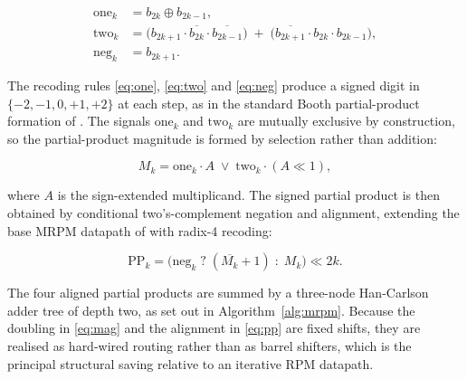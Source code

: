 \documentclass[conference]{IEEEtran}
\begin{document}
\begin{align}
\mathrm{one}_k &= b_{2k} \oplus b_{2k-1}, \label{eq:one}\\
\mathrm{two}_k &= \big(b_{2k+1}\cdot \overline{b_{2k}} \cdot
                  \overline{b_{2k-1}}\big) \;+\;
                 \big(\overline{b_{2k+1}}\cdot b_{2k} \cdot
                  b_{2k-1}\big), \label{eq:two}\\
\mathrm{neg}_k &= b_{2k+1}. \label{eq:neg}
\end{align}

\noindent The recoding rules \eqref{eq:one}, \eqref{eq:two}
and \eqref{eq:neg} produce a signed digit in $\{-2,-1,0,+1,+2\}$ at each
step, as in the standard Booth partial-product formation of \cite{prabhu}.
The signals
$\mathrm{one}_k$ and $\mathrm{two}_k$ are mutually exclusive by
construction, so the partial-product magnitude is formed by selection
rather than addition:

\begin{equation}
M_k = \mathrm{one}_k \cdot A \;\vee\; \mathrm{two}_k \cdot (A \ll 1),
\label{eq:mag}
\end{equation}

\noindent where $A$ is the sign-extended multiplicand. The signed
partial product is then obtained by conditional two's-complement
negation and alignment, extending the base MRPM datapath of \cite{base}
with radix-4 recoding:

\begin{equation}
\mathrm{PP}_k = \big(\mathrm{neg}_k \;?\; (\overline{M_k} + 1)
                 \;:\; M_k \big) \ll 2k .
\label{eq:pp}
\end{equation}

The four aligned partial products are summed by a three-node
Han-Carlson adder tree of depth two, as set out in
Algorithm~\ref{alg:mrpm}. Because the doubling in \eqref{eq:mag} and
the alignment in \eqref{eq:pp} are fixed shifts, they are realised as
hard-wired routing rather than as barrel shifters, which is the
principal structural saving relative to an iterative RPM datapath.
\end{document}
